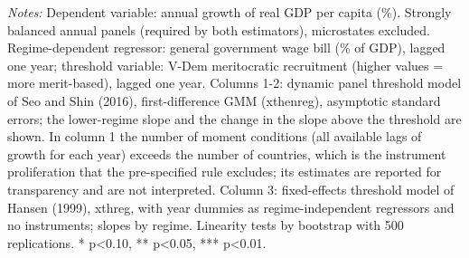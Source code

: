 \begin{table}[htbp]
\begin{minipage}{0.95\linewidth}\vspace{4pt}\scriptsize \textit{Notes:} Dependent variable: annual growth of real GDP per capita (\%). Strongly balanced annual panels (required by both estimators), microstates excluded. Regime-dependent regressor: general government wage bill (\% of GDP), lagged one year; threshold variable: V-Dem meritocratic recruitment (higher values = more merit-based), lagged one year. Columns 1-2: dynamic panel threshold model of Seo and Shin (2016), first-difference GMM (xthenreg), asymptotic standard errors; the lower-regime slope and the change in the slope above the threshold are shown. In column 1 the number of moment conditions (all available lags of growth for each year) exceeds the number of countries, which is the instrument proliferation that the pre-specified rule excludes; its estimates are reported for transparency and are not interpreted. Column 3: fixed-effects threshold model of Hansen (1999), xthreg, with year dummies as regime-independent regressors and no instruments; slopes by regime. Linearity tests by bootstrap with 500 replications. * p<0.10, ** p<0.05, *** p<0.01.\end{minipage}
\end{table}
